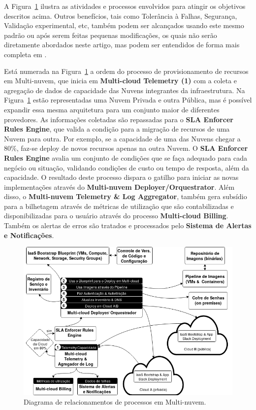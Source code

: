 \documentclass[12pt]{article}
\begin{document}
	A Figura~\ref{fig:figure1} ilustra as atividades e processos envolvidos para atingir os objetivos descritos acima. Outros benefícios, tais como Tolerância à Falhas, Segurança, Validação experimental, etc, também podem ser alcançados usando este mesmo padrão ou após serem feitas pequenas modificações, os quais não serão diretamente abordados neste artigo, mas podem ser entendidos de forma mais completa em \cite{Fisher:2018}.
	
	Está numerada na Figura~\ref{fig:figure1} a ordem do processo de provisionamento de recursos em Multi-nuvem, que inicia em \textbf{Multi-cloud Telemetry (1)} com a coleta e agregação de dados de capacidade das Nuvens integrantes da infraestrutura. Na Figura~\ref{fig:figure1} estão representadas uma Nuvem Privada e outra Pública, mas é possível expandir essa mesma arquitetura para um conjunto maior de diferentes provedores. As informações coletadas são repassadas para o \textbf{SLA Enforcer Rules Engine}, que valida a condição para a migração de recursos de uma Nuvem para outra. Por exemplo, se a capacidade de uma das Nuvens chegar a 80\%, faz-se deploy de novos recursos apenas na outra Nuvem. O \textbf{SLA Enforcer Rules Engine} avalia um conjunto de condições que se faça adequado para cada negócio ou situação, validando condições de custo ou tempo de resposta, além da capacidade. O resultado deste processo dispara o gatilho para iniciar as novas implementações através do \textbf{Multi-nuvem Deployer/Orquestrator}. Além disso, o \textbf{Multi-nuvem Telemetry \& Log Aggregator}, também gera subsídio para a bilhetagem através de métricas de utilização que são contabilizadas e disponibilizadas para o usuário através do processo \textbf{Multi-cloud Billing}. Também os alertas de erros são tratados e processados pelo \textbf{Sistema de Alertas e Notificações}.
		
	\begin{figure}[H]
		\centering
		\includegraphics[width=0.9\linewidth]{figuras/Figure1.png}
		\caption{Diagrama de relacionamentos de processos em Multi-nuvem.}
		\label{fig:figure1}
	\end{figure}
\end{document}
